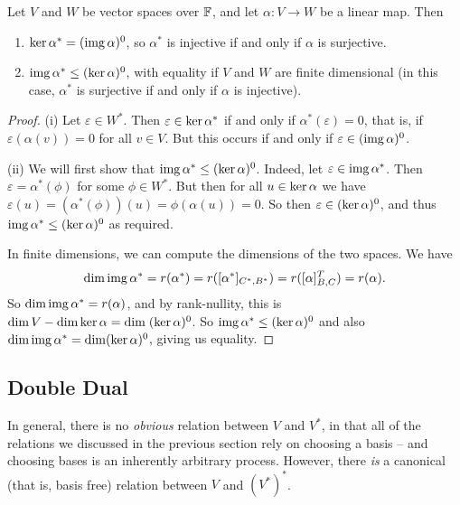 \documentclass[a4paper]{scrartcl}
\begin{document}
\begin{proposition}
    Let $V$ and $W$ be vector spaces over $\mathbb{F}$, and let $\alpha: V \rightarrow W$ be a linear map. Then
    \begin{enumerate}[label=(\roman*)]
        \item $\operatorname{ker} \alpha^* = (\operatorname{img} \alpha)^0$, so $\alpha^*$ is injective if and only if $\alpha$ is surjective.
        \item $\operatorname{img} \alpha^* \leq (\operatorname{ker} \alpha)^0$, with equality if $V$ and $W$ are finite dimensional (in this case, $\alpha^*$ is surjective if and only if $\alpha$ is injective).
    \end{enumerate}
\end{proposition}
\begin{proof}
    (i) Let $\varepsilon \in W^*$. Then $\varepsilon \in \operatorname{ker} \alpha^*$ if and only if $\alpha^*(\varepsilon) = 0$, that is, if $\varepsilon(\alpha(v)) = 0$ for all $v \in V$. But this occurs if and only if $\varepsilon \in (\operatorname{img} \alpha)^0$.

    (ii) We will first show that $\operatorname{img} \alpha^* \leq (\operatorname{ker} \alpha)^0$. Indeed, let $\varepsilon \in \operatorname{img} \alpha^*$. Then $\varepsilon = \alpha^*(\phi)$ for some $\phi \in W^*$. But then for all $u \in \operatorname{ker} \alpha$ we have $\varepsilon (u) = (\alpha^*(\phi))(u) = \phi(\alpha(u)) = 0$. So then $\varepsilon \in (\operatorname{ker} \alpha)^0$, and thus $\operatorname{img} \alpha^* \leq (\operatorname{ker} \alpha)^0$ as required. 

    In finite dimensions, we can compute the dimensions of the two spaces. We have
    $$
    \dim \operatorname{img} \alpha^* = r(\alpha^*) = r([\alpha^*]_{C^*, B^*}) = r([\alpha]^T_{B, C}) = r(\alpha).
    $$
    So $\dim \operatorname{img} \alpha^* = r(\alpha)$, and by rank-nullity, this is $\dim V - \dim \operatorname{ker} \alpha = \dim \; (\operatorname{ker} \alpha)^0$. So $\operatorname{img} \alpha^* \leq (\operatorname{ker} \alpha)^0$ and also $\dim \operatorname{img} \alpha^* = \dim (\operatorname{ker} \alpha)^0$,  giving us equality.
\end{proof}

\subsection{Double Dual}

In general, there is no \emph{obvious} relation between $V$ and $V^*$, in that all of the relations we discussed in the previous section rely on choosing a basis -- and choosing bases is an inherently arbitrary process. However, there \emph{is} a canonical (that is, basis free) relation between $V$ and $(V^*)^*$.
\end{document}
